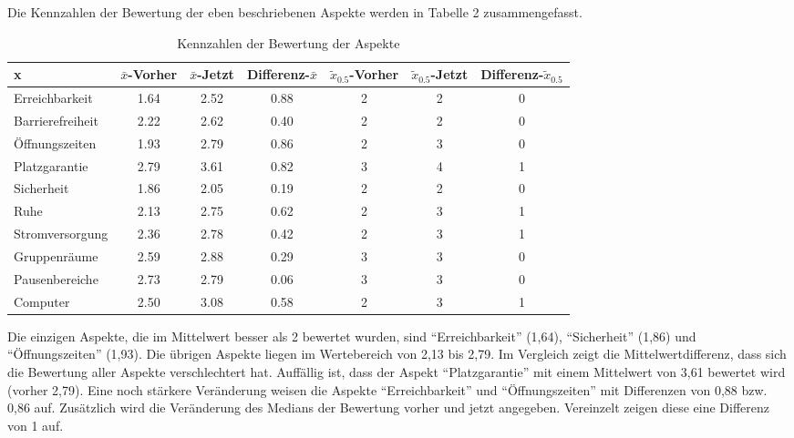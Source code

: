 \documentclass[11pt, a4paper]{article}
\begin{document}
Die Kennzahlen der Bewertung der eben beschriebenen Aspekte werden in Tabelle 2 zusammengefasst.
\begin{table}[h]
	\vspace*{0cm}
	\hspace*{0.48cm}
	\begin{tabular}{l|cccccc}
		x                & $\bar{x}$-Vorher & $\bar{x}$-Jetzt & Differenz-$\bar{x}$ & $\tilde{x}_{0.5}$-Vorher & $\tilde{x}_{0.5}$-Jetzt & Differenz-$\tilde{x}_{0.5}$\\ \hline
		Erreichbarkeit   & 1.64              & 2.52             & 0.88                 & 2             & 2            & 0                     \\
		Barrierefreiheit & 2.22              & 2.62             & 0.40                 & 2             & 2            & 0                     \\
		Öffnungszeiten   & 1.93              & 2.79             & 0.86                 & 2             & 3            & 0                     \\
		Platzgarantie    & 2.79              & 3.61             & 0.82                 & 3             & 4            & 1                     \\
		Sicherheit       & 1.86              & 2.05             & 0.19                 & 2             & 2            & 0                     \\
		Ruhe             & 2.13              & 2.75             & 0.62                 & 2             & 3            & 1                     \\
		Stromversorgung  & 2.36              & 2.78             & 0.42                 & 2             & 3            & 1                     \\
		Gruppenräume     & 2.59              & 2.88             & 0.29                 & 3             & 3            & \multicolumn{1}{c}{0} \\
		Pausenbereiche   & 2.73              & 2.79             & 0.06                 & 3             & 3            & 0                     \\
		Computer         & 2.50              & 3.08             & 0.58                 & 2             & 3            & 1                    
	\end{tabular}
			\caption{Kennzahlen der Bewertung der Aspekte}
\end{table}

Die einzigen Aspekte, die im Mittelwert besser als 2 bewertet wurden, sind “Erreichbarkeit” (1,64), “Sicherheit” (1,86) und “Öffnungszeiten” (1,93). Die übrigen Aspekte liegen im Wertebereich von 2,13 bis 2,79.
Im Vergleich zeigt die Mittelwertdifferenz, dass sich die Bewertung aller Aspekte verschlechtert hat. Auffällig ist, dass der Aspekt “Platzgarantie” mit einem Mittelwert von 3,61 bewertet wird (vorher 2,79). Eine noch stärkere Veränderung weisen die Aspekte “Erreichbarkeit” und “Öffnungszeiten” mit Differenzen von 0,88 bzw. 0,86 auf.
Zusätzlich wird die Veränderung des Medians der Bewertung vorher und jetzt angegeben. Vereinzelt zeigen diese eine Differenz von 1 auf.
\end{document}
